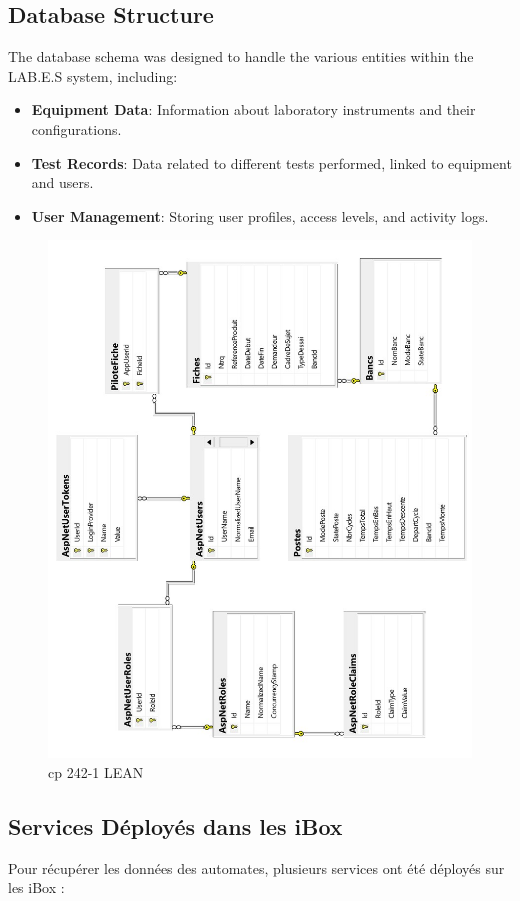 \subsection{Database Structure}
The database schema was designed to handle the various entities within the LAB.E.S system, including:
\begin{itemize}
    \item \textbf{Equipment Data}: Information about laboratory instruments and their configurations.
    \item \textbf{Test Records}: Data related to different tests performed, linked to equipment and users.
    \item \textbf{User Management}: Storing user profiles, access levels, and activity logs.
\end{itemize}
\begin{figure}[H]
    \centering
    \includegraphics[width=1\textwidth]{chapters/3/img/16.jpg}
    \caption{cp 242-1 LEAN}
    \label{fig:campus}
\end{figure}


\subsection
{Services Déployés dans les iBox}
Pour récupérer les données des automates, plusieurs services ont été déployés sur les iBox :

